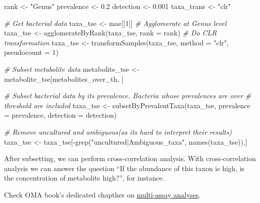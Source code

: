 \documentclass[
  oneside]{book}
\newenvironment{Shaded}{\begin{snugshade}}{\end{snugshade}}
\newcommand{\AttributeTok}[1]{\textcolor[rgb]{0.77,0.63,0.00}{#1}}
\newcommand{\CommentTok}[1]{\textcolor[rgb]{0.56,0.35,0.01}{\textit{#1}}}
\newcommand{\DecValTok}[1]{\textcolor[rgb]{0.00,0.00,0.81}{#1}}
\newcommand{\FloatTok}[1]{\textcolor[rgb]{0.00,0.00,0.81}{#1}}
\newcommand{\FunctionTok}[1]{\textcolor[rgb]{0.00,0.00,0.00}{#1}}
\newcommand{\NormalTok}[1]{#1}
\newcommand{\OtherTok}[1]{\textcolor[rgb]{0.56,0.35,0.01}{#1}}
\newcommand{\SpecialCharTok}[1]{\textcolor[rgb]{0.00,0.00,0.00}{#1}}
\newcommand{\StringTok}[1]{\textcolor[rgb]{0.31,0.60,0.02}{#1}}
\begin{document}
\begin{Shaded}
\begin{Highlighting}[]
\NormalTok{rank }\OtherTok{\textless{}{-}} \StringTok{"Genus"}
\NormalTok{prevalence }\OtherTok{\textless{}{-}} \FloatTok{0.2}
\NormalTok{detection }\OtherTok{\textless{}{-}} \FloatTok{0.001}
\NormalTok{taxa\_trans }\OtherTok{\textless{}{-}}  \StringTok{"clr"}

\CommentTok{\# Get bacterial data}
\NormalTok{taxa\_tse }\OtherTok{\textless{}{-}}\NormalTok{ mae[[}\DecValTok{1}\NormalTok{]]}
\CommentTok{\# Agglomerate at Genus level}
\NormalTok{taxa\_tse }\OtherTok{\textless{}{-}} \FunctionTok{agglomerateByRank}\NormalTok{(taxa\_tse, }\AttributeTok{rank =}\NormalTok{ rank)}
\CommentTok{\# Do CLR transformation}
\NormalTok{taxa\_tse }\OtherTok{\textless{}{-}} \FunctionTok{transformSamples}\NormalTok{(taxa\_tse, }\AttributeTok{method =} \StringTok{"clr"}\NormalTok{, }\AttributeTok{pseudocount =} \DecValTok{1}\NormalTok{)}

\CommentTok{\# Subset metabolite data}
\NormalTok{metabolite\_tse }\OtherTok{\textless{}{-}}\NormalTok{ metabolite\_tse[metabolites\_over\_th, ]}

\CommentTok{\# Subset bacterial data by its prevalence. Bacteria whose prevalences are over }
\CommentTok{\# threshold are included}
\NormalTok{taxa\_tse }\OtherTok{\textless{}{-}} \FunctionTok{subsetByPrevalentTaxa}\NormalTok{(taxa\_tse, }
                                  \AttributeTok{prevalence =}\NormalTok{ prevalence, }
                                  \AttributeTok{detection =}\NormalTok{ detection)}

\CommentTok{\# Remove uncultured and ambiguous(as it\textquotesingle{}s hard to interpret their results)}
\NormalTok{taxa\_tse }\OtherTok{\textless{}{-}}\NormalTok{ taxa\_tse[}\SpecialCharTok{{-}}\FunctionTok{grep}\NormalTok{(}\StringTok{"uncultured|Ambiguous\_taxa"}\NormalTok{, }\FunctionTok{names}\NormalTok{(taxa\_tse)),]}
\end{Highlighting}
\end{Shaded}

After subsetting, we can perform cross-correlation analysis. With cross-correlation
analysis we can answer the question ``If the abundance of this taxon is high, is the
concentration of metabolite high?'', for instance.

Check OMA book's dedicated chapther on
\href{https://microbiome.github.io/OMA/multi-assay_analyses.html}{multi-assay analyses}.
\end{document}
